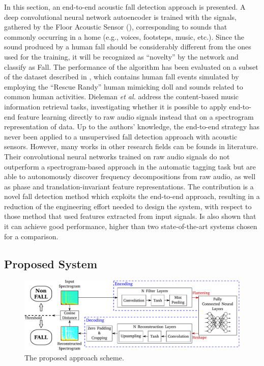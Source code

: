In this section, an end-to-end acoustic fall detection approach is presented. A deep convolutional neural network autoencoder is trained with the signals, gathered by the Floor Acoustic Sensor (), corresponding to sounds that commonly occurring in a home (e.g., voices, footsteps, music, etc.). Since the sound produced by a human fall should be considerably different from the ones used for the training, it will be recognized as ``novelty'' by the network and classify as Fall. 
The performance of the algorithm has been evaluated on a subset of the dataset described in , which contains human fall events simulated by employing the “Rescue Randy” human mimicking doll \cite{Werner2011,zigel2009method,alwan2006smart} and sounds related to common human activities.
Dieleman \textit{et al.} \cite{dieleman2014end} address the content-based music information retrieval tasks, investigating whether it is possible to apply end-to-end feature learning directly to raw audio signals instead that on a spectrogram representation of data.   
Up to the authors' knowledge, the end-to-end strategy has never been applied to a unsupervised fall detection approach with acoustic sensors. However, many works in other research fields can be founds in literature. 
Their convolutional neural networks trained on raw audio signals do not outperform a spectrogram-based approach in the automatic tagging task but are able to autonomously discover frequency decompositions from raw audio, as well as phase and translation-invariant feature representations.
The contribution is a novel fall detection method which exploits the end-to-end approach, resulting in a reduction of the engineering effort needed to design the system, with respect to those method that used features extracted from input signals. Is also shown that it can achieve good performance, higher than two state-of-the-art systems chosen for a comparison.


\subsection{Proposed System}
\label{sec:proposedApproach}

\begin{figure}[htb]
	\centering
	\includegraphics[width=\columnwidth]{img/wirn2017/approccioComplessivo.pdf}
	\caption{The proposed approach scheme.}\label{fig:overall}
\end{figure}

